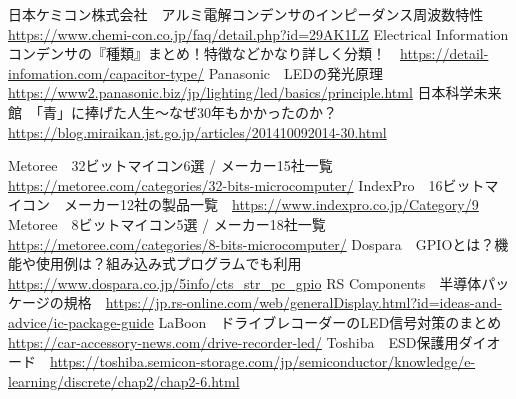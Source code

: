 
\begin{thebibliography}{99}
    \setcounter{num}{2}
    \bibitem{}日本ケミコン株式会社　アルミ電解コンデンサのインピーダンス周波数特性　\url{https://www.chemi-con.co.jp/faq/detail.php?id=29AK1LZ}
    \bibitem{}Electrical Information　コンデンサの『種類』まとめ！特徴などかなり詳しく分類！　\url{https://detail-infomation.com/capacitor-type/}
    \bibitem{}Panasonic　LEDの発光原理　\url{https://www2.panasonic.biz/jp/lighting/led/basics/principle.html}
    \bibitem{}日本科学未来館　「青」に捧げた人生～なぜ30年もかかったのか？　\url{https://blog.miraikan.jst.go.jp/articles/201410092014-30.html}



    \bibitem{}Metoree　32ビットマイコン6選 / メーカー15社一覧　\url{https://metoree.com/categories/32-bits-microcomputer/}
    \bibitem{}IndexPro　16ビットマイコン　メーカー12社の製品一覧　\url{https://www.indexpro.co.jp/Category/9}
    \bibitem{}Metoree　8ビットマイコン5選 / メーカー18社一覧　\url{https://metoree.com/categories/8-bits-microcomputer/}
    \bibitem{}Dospara　GPIOとは？機能や使用例は？組み込み式プログラムでも利用　\url{https://www.dospara.co.jp/5info/cts_str_pc_gpio}
    \bibitem{}RS Components　半導体パッケージの規格　\url{https://jp.rs-online.com/web/generalDisplay.html?id=ideas-and-advice/ic-package-guide}
    \bibitem{}LaBoon　ドライブレコーダーのLED信号対策のまとめ　\url{https://car-accessory-news.com/drive-recorder-led/}
    \bibitem{}Toshiba　ESD保護用ダイオード　\url{https://toshiba.semicon-storage.com/jp/semiconductor/knowledge/e-learning/discrete/chap2/chap2-6.html}
\end{thebibliography}